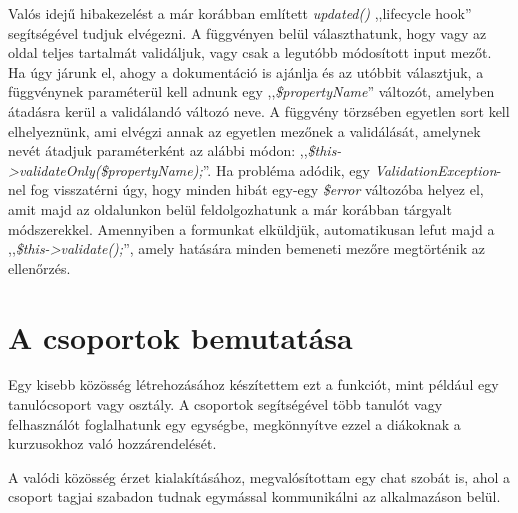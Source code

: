 \documentclass[
]{thesis-ekf}
\theoremstyle{definition}
\theoremstyle{remark}
\begin{document}
                Valós idejű hibakezelést a már korábban említett \emph{updated()} ,,lifecycle hook'' segítségével tudjuk elvégezni. A függvényen belül választhatunk, hogy vagy az oldal teljes tartalmát validáljuk, vagy csak a legutóbb módosított input mezőt. Ha úgy járunk el, ahogy a dokumentáció is ajánlja és az utóbbit választjuk, a függvénynek paraméterül kell adnunk egy ,,\emph{\$propertyName}'' változót, amelyben átadásra kerül a validálandó változó neve. A függvény törzsében egyetlen sort kell elhelyeznünk, ami elvégzi annak az egyetlen mezőnek a validálását, amelynek nevét átadjuk paraméterként az alábbi módon:               ,,\emph{\$this->validateOnly(\$propertyName);}''. Ha probléma adódik, egy \emph{ValidationException}-nel fog visszatérni úgy, hogy minden hibát egy-egy \emph{\$error} változóba helyez el, amit majd az oldalunkon belül feldolgozhatunk a már korábban tárgyalt módszerekkel.
                Amennyiben a formunkat elküldjük, automatikusan lefut majd a ,,\emph{\$this->validate();}'', amely hatására minden bemeneti mezőre megtörténik az ellenőrzés.

                
        \chapter{A csoportok bemutatása}\label{Csoportok-bemutat}
            Egy kisebb közösség létrehozásához készítettem ezt a funkciót, mint például egy tanulócsoport vagy osztály. A csoportok segítségével több tanulót vagy felhasználót foglalhatunk egy egységbe, megkönnyítve ezzel a diákoknak a kurzusokhoz való hozzárendelését.

            A valódi közösség érzet kialakításához, megvalósítottam egy chat szobát is, ahol a csoport tagjai szabadon tudnak egymással kommunikálni az alkalmazáson belül.
\end{document}
